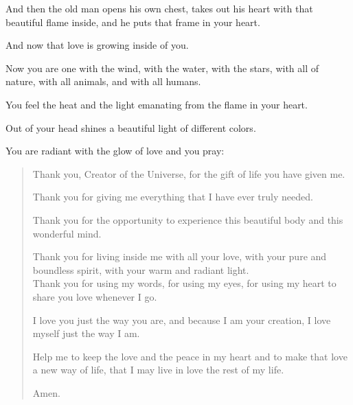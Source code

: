 \documentclass{article}
\numberwithin{equation}{section}
\begin{document}
%
And then the old man opens his own chest, takes out his heart with that beautiful flame inside, and he puts that frame in your heart.

And now that love is growing inside of you.

Now you are one with the wind, with the water, with the stars, with all of nature, with all animals, and with all humans.

You feel the heat and the light emanating from the flame in your heart.

Out of your head shines a beautiful light of different colors.

You are radiant with the glow of love and you pray:
\begin{quotation}
    Thank you, Creator of the Universe, for the gift of life you have given me.
    
    Thank you for giving me everything that I have ever truly needed.
    
    Thank you for the opportunity to experience this beautiful body and this wonderful mind.
    
    Thank you for living inside me with all your love, with your pure and boundless spirit, with your warm and radiant light.
    \\
    
    Thank you for using my words, for using my eyes, for using my heart to share you love whenever I go.
    
    I love you just the way you are, and because I am your creation, I love myself just the way I am.
    
    Help me to keep the love and the peace in my heart and to make that love a new way of life, that I may live in love the rest of my life.
    
    Amen.
\end{quotation}
\end{document}
